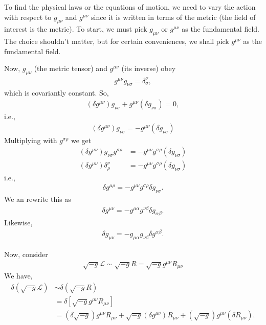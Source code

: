 \documentclass{book}
\numberwithin{equation}{section}
\theoremstyle{definition}
\newcommand{\lag}{\mathcal{L}}
\newcommand{\nn}{\nonumber}
\newcommand{\lb}{\left[}
\newcommand{\rb}{\right]}
\begin{document}
To find the physical laws or the equations of motion, we need to vary the action with respect to $g_{\mu\nu}$ and $g^{\mu\nu}$ since it is written in terms of the metric (the field of interest is the metric). To start, we must pick $g_{\mu\nu}$ or $g^{\mu\nu}$ as the fundamental field. The choice shouldn't matter, but for certain conveniences, we shall pick $g^{\mu\nu}$ as the fundamental field. 

Now, $g_{\mu\nu}$ (the metric tensor) and $g^{\mu\nu}$ (its inverse) obey
\begin{align}
g^{\mu\nu}g_{\nu\sigma} = \delta^\nu_\sigma,
\end{align}  
which is covariantly constant. So,
\begin{align}
(\delta g^{\mu\nu}) g_{\nu\sigma} + g^{\mu\nu}(\delta g_{\nu\sigma}) = 0,
\end{align}
i.e.,
\begin{align}
(\delta g^{\mu\nu}) g_{\nu\sigma} = -g^{\mu\nu}(\delta g_{\nu\sigma})
\end{align}
Multiplying with $g^{\sigma\rho}$ we get
\begin{align}
(\delta g^{\mu\nu})g_{\nu\sigma}g^{\sigma\rho} &= -g^{\mu\nu}g^{\sigma\rho}(\delta g_{\nu\sigma})\\
(\delta g^{\mu\nu})\delta^\nu_\rho &=  -g^{\mu\nu}g^{\sigma\rho}(\delta g_{\nu\sigma})
\end{align}
i.e.,
\begin{align}
\delta g^{\mu\rho} = -g^{\mu\nu}g^{\sigma\rho}\delta g_{\nu\sigma}.
\end{align}
We an rewrite this as
\begin{align}
\delta g^{\mu\nu} = -g^{\mu\alpha} g^{\nu\beta}\delta g_{\alpha\beta}.
\end{align}
Likewise, 
\begin{align}
\delta g_{\mu\nu} = -g_{\mu\alpha}g_{\nu\beta}\delta g^{\alpha\beta}.
\end{align}

Now, consider 
\begin{align}
\sqrt{-g}\lag \sim \sqrt{-g}R = \sqrt{-g}g^{\mu\nu}R_{\mu\nu}
\end{align}
We have,
\begin{align}
\delta(\sqrt{-g}\lag) &\sim \delta (\sqrt{-g} R)\nn\\
&=\delta\lb \sqrt{-g}g^{\mu\nu}R_{\mu\nu} \rb\nn\\
&= (\delta \sqrt{-g})g^{\mu\nu}R_{\mu\nu} + \sqrt{-g}(\delta g^{\mu\nu})R_{\mu\nu} + (\sqrt{-g})g^{\mu\nu}(\delta R_{\mu\nu}).  
\end{align}
\end{document}
